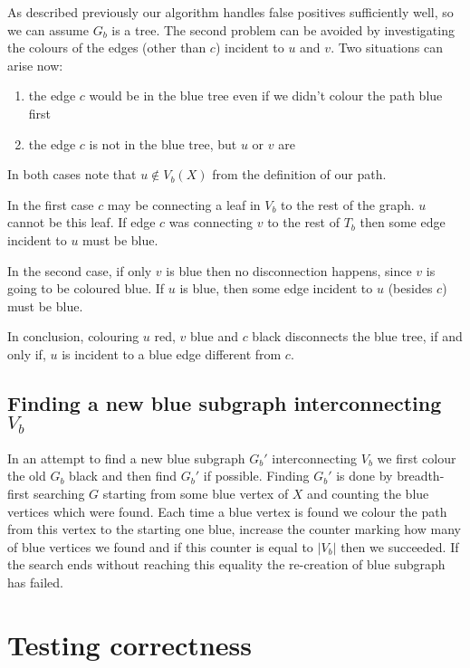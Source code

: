 As described previously our algorithm handles false positives sufficiently well, so we can assume $G_b$ is a tree. The second problem can be avoided by investigating the colours of the edges (other than $c$) incident to $u$ and $v$. Two situations can arise now:

\begin{enumerate}
	\item the edge $c$ would be in the blue tree even if we didn't colour the path blue first
	\item the edge $c$ is not in the blue tree, but $u$ or $v$ are
\end{enumerate}

In both cases note that $u \not \in V_b(X)$ from the definition of our path.

In the first case $c$ may be connecting a leaf in $V_b$ to the rest of the graph. $u$ cannot be this leaf. If edge $c$ was connecting $v$ to the rest of $T_b$ then some edge incident to $u$ must be blue.

In the second case, if only $v$ is blue then no disconnection happens, since $v$ is going to be coloured blue. If $u$ is blue, then some edge incident to $u$ (besides $c$) must be blue.

In conclusion, colouring $u$ red, $v$ blue and $c$ black disconnects the blue tree, if and only if, $u$ is incident to a blue edge different from $c$.

\subsection*{Finding a new blue subgraph interconnecting $V_b$}

In an attempt to find a new blue subgraph $G_b'$ interconnecting $V_b$ we first colour the old $G_b$ black and then find $G_b'$ if possible. Finding $G_b'$ is done by breadth-first searching $G$ starting from some blue vertex of $X$ and counting the blue vertices which were found. Each time a blue vertex is found we colour the path from this vertex to the starting one blue, increase the counter marking how many of blue vertices we found and if this counter is equal to $\lvert V_b \rvert$ then we succeeded. If the search ends without reaching this equality the re-creation of blue subgraph has failed.

\section{Testing correctness}

